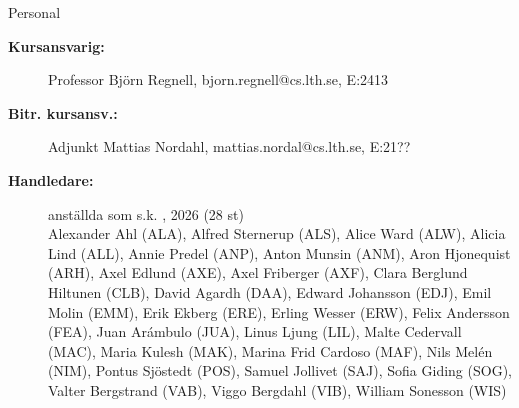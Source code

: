 \ifkompendium\else
\begin{SlideExtra}{Personal \CurrentYear}\SlideFontSmall
\begin{description}
\item [\bfseries Kursansvarig:] Professor Björn Regnell, bjorn.regnell@cs.lth.se, E:2413
\item [\bfseries Bitr. kursansv.:] Adjunkt Mattias Nordahl, mattias.nordal@cs.lth.se, E:21??
\item [\bfseries Handledare:]  anställda som s.k. , %
2026 (28 st) \\
Alexander Ahl (ALA), 
Alfred Sternerup (ALS), 
Alice Ward (ALW), 
Alicia Lind (ALL), 
Annie Predel (ANP), 
Anton Munsin (ANM), 
Aron Hjonequist (ARH), 
Axel Edlund (AXE), 
Axel Friberger (AXF), 
Clara Berglund Hiltunen (CLB), 
David Agardh (DAA), 
Edward Johansson (EDJ), 
Emil Molin (EMM), 
Erik Ekberg (ERE), 
Erling Wesser (ERW), 
Felix Andersson (FEA), 
Juan Arámbulo (JUA), 
Linus Ljung (LIL), 
Malte Cedervall (MAC), 
Maria Kulesh (MAK), 
Marina Frid Cardoso (MAF), 
Nils Melén (NIM), 
Pontus Sjöstedt (POS), 
Samuel Jollivet (SAJ), 
Sofia Giding (SOG), 
Valter Bergstrand (VAB), 
Viggo Bergdahl (VIB), 
William Sonesson (WIS)




\end{description}
\end{SlideExtra}
